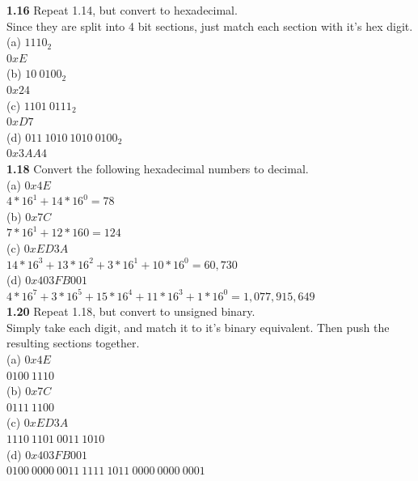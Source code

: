 \documentclass[12pt,a4paper]{report}
\begin{document}
\begin{normalsize}
\textbf{1.16} Repeat 1.14, but convert to hexadecimal. \\
Since they are split into 4 bit sections, just match each section with it's hex digit.\\
(a) $ 1110_{2} $ \\
$ 0xE $ \\
(b) $ 10\:0100_{2} $ \\
$ 0x24 $ \\
(c) $ 1101\:0111_{2} $ \\
$ 0xD7 $ \\
(d) $ 011\:1010\:1010\:0100_{2} $ \\
$ 0x3AA4 $ \\

\textbf{1.18} Convert the following hexadecimal numbers to decimal. \\
(a) $ 0x4E $ \\
$ 4*16^{1} + 14*16^{0} = 78 $ \\
(b) $ 0x7C $ \\
$ 7*16^{1} + 12*16{0} = 124 $ \\
(c) $ 0xED3A $ \\
$ 14*16^{3} + 13*16^{2} + 3*16^{1} + 10*16^{0} = 60,730 $ \\
(d) $ 0x403FB001 $ \\
$ 4*16^{7} + 3*16^{5} + 15*16^{4} + 11*16^{3} + 1*16^{0} = 1,077,915,649 $ \\

\textbf{1.20} Repeat 1.18, but convert to unsigned binary. \\
Simply take each digit, and match it to it's binary equivalent. Then push the resulting sections together. \\
(a) $ 0x4E $ \\
$ 0100\: 1110 $ \\
(b) $ 0x7C $ \\
$ 0111\: 1100 $ \\
(c) $ 0xED3A $ \\
$ 1110\: 1101\: 0011\: 1010 $ \\
(d) $ 0x403FB001 $ \\
$ 0100\: 0000\: 0011\: 1111\: 1011\: 0000\: 0000\: 0001 $ \\


\end{normalsize}
\end{document}
